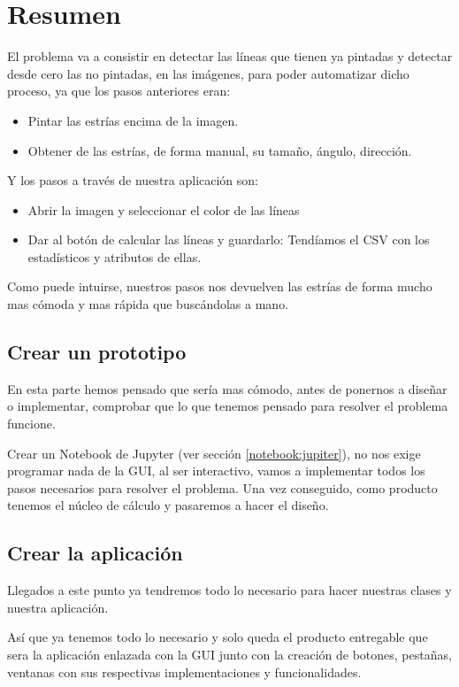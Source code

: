 \section{Resumen}

El problema va a consistir en detectar las líneas que tienen ya pintadas y detectar desde cero las no pintadas, en las imágenes, para poder automatizar dicho proceso, ya que los pasos anteriores eran:
\begin{itemize}
\item Pintar las estrías encima de la imagen.
\item Obtener de las estrías, de forma manual, su tamaño, ángulo, dirección.
\end{itemize}
Y los pasos a través de nuestra aplicación son:
\begin{itemize}
\item Abrir la imagen y seleccionar el color de las líneas
\item Dar al botón de calcular las líneas y guardarlo: Tendíamos el CSV con los estadísticos y atributos de ellas.
\end{itemize}
Como puede intuirse, nuestros pasos nos devuelven las estrías de forma mucho mas cómoda y mas rápida que buscándolas a mano.

\subsection{Crear un prototipo} 
En esta parte hemos pensado que sería mas cómodo, antes de ponernos a diseñar o implementar, comprobar que lo que tenemos pensado para resolver el problema funcione.

Crear un Notebook de Jupyter (ver sección \ref{notebook:jupiter}), no nos exige programar nada de la GUI, al ser interactivo, vamos a implementar todos los pasos necesarios para resolver el problema. 
Una vez conseguido, como producto tenemos el núcleo de cálculo y pasaremos a hacer el diseño.

\subsection{Crear la aplicación}
Llegados a este punto ya tendremos todo lo necesario para hacer nuestras clases y nuestra aplicación.

Así que ya tenemos todo lo necesario y solo queda el producto entregable que sera la aplicación enlazada con la GUI junto con la creación de botones, pestañas, ventanas con sus respectivas implementaciones y funcionalidades.